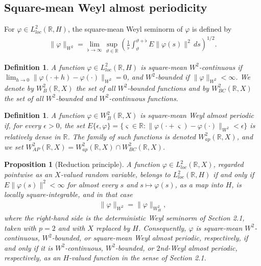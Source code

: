 \documentclass[11pt]{amsart}
\newtheorem{proposition}[theorem]{Proposition}
\newtheorem{definition}[theorem]{Definition}
\begin{document}
\subsection{Square-mean Weyl almost periodicity}

For $\varphi\in L^2_{loc}(\mathbb R,H)$, the square-mean Weyl seminorm of $\varphi$ is defined by
\begin{align*}
\|\varphi\|_{W^2}=\lim_{\flat\to\infty}\sup_{\vartheta\in\mathbb R}\left(\frac1\flat\int_{\vartheta}^{\vartheta+\flat}E\|\varphi(s)\|^2\,ds\right)^{1/2}.
\end{align*}

\begin{definition}
A function $\varphi\in L^2_{loc}(\mathbb R,H)$ is square-mean $W^2$-continuous if $\lim_{h\to0}\|\varphi(\cdot+h)-\varphi(\cdot)\|_{W^2}=0$, and $W^2$-bounded if $\|\varphi\|_{W^2}<\infty$. We denote by $W^2_{B}(\mathbb R,X)$ the set of all $W^2$-bounded functions and by $W^2_{BC}(\mathbb R,X)$ the set of all $W^2$-bounded and $W^2$-continuous functions.
\end{definition}

\begin{definition}
A function $\varphi\in W^2_{B}(\mathbb R,X)$ is square-mean Weyl almost periodic if, for every $\epsilon>0$, the set $E\{\epsilon,\varphi\}=\{\varsigma\in\mathbb R:\|\varphi(\cdot+\varsigma)-\varphi(\cdot)\|_{W^2}<\epsilon\}$ is relatively dense in $\mathbb R$. The family of such functions is denoted $W^2_{ap}(\mathbb R,X)$, and we set $W^2_{AP}(\mathbb R,X)=W^2_{ap}(\mathbb R,X)\cap W^2_{BC}(\mathbb R,X)$.
\end{definition}

\begin{proposition}[Reduction principle]\label{reduction}
A function $\varphi\in L^2_{loc}(\mathbb R,X)$, regarded pointwise as an $X$-valued random variable, belongs to $L^2_{loc}(\mathbb R,H)$ if and only if $E\|\varphi(s)\|^2<\infty$ for almost every $s$ and $s\mapsto\varphi(s)$, as a map into $H$, is locally square-integrable, and in that case
\begin{align*}
\|\varphi\|_{W^2}=\|\varphi\|_{W^2_H},
\end{align*}
where the right-hand side is the deterministic Weyl seminorm of Section 2.1, taken with $p=2$ and with $X$ replaced by $H$. Consequently, $\varphi$ is square-mean $W^2$-continuous, $W^2$-bounded, or square-mean Weyl almost periodic, respectively, if and only if it is $W^2$-continuous, $W^2$-bounded, or $2$nd-Weyl almost periodic, respectively, as an $H$-valued function in the sense of Section 2.1.
\end{proposition}
\end{document}
